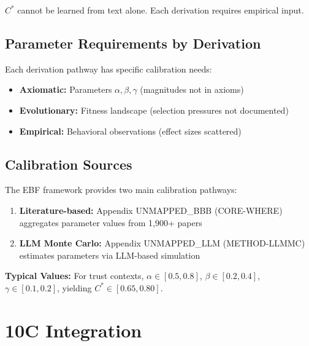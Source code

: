 $C^*$ cannot be learned from text alone. Each derivation requires empirical input.

\subsection{Parameter Requirements by Derivation}
\label{sec:ch6-param-requirements}

Each derivation pathway has specific calibration needs:

\begin{itemize}[nosep]
    \item \textbf{Axiomatic:} Parameters $\alpha, \beta, \gamma$ (magnitudes not in axioms)
    \item \textbf{Evolutionary:} Fitness landscape (selection pressures not documented)
    \item \textbf{Empirical:} Behavioral observations (effect sizes scattered)
\end{itemize}

\subsection{Calibration Sources}
\label{sec:ch6-calibration-sources}

The EBF framework provides two main calibration pathways:
\begin{enumerate}[nosep]
    \item \textbf{Literature-based:} Appendix UNMAPPED_BBB (CORE-WHERE) aggregates parameter values from 1,900+ papers
    \item \textbf{LLM Monte Carlo:} Appendix UNMAPPED_LLM (METHOD-LLMMC) estimates parameters via LLM-based simulation
\end{enumerate}

\textbf{Typical Values:} For trust contexts, $\alpha \in [0.5, 0.8]$, $\beta \in [0.2, 0.4]$,
$\gamma \in [0.1, 0.2]$, yielding $C^* \in [0.65, 0.80]$.



\section{10C Integration}
\label{sec:cstar-integration}

